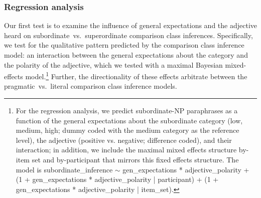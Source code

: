 \documentclass[doc, floatsintext]{apa6}
\newcommand{\red}[1]{\textcolor{Red}{#1}}
\newcommand{\mht}[1]{\textcolor{Blue}{[mht: #1]}}
\begin{document}


\subsubsection{Regression analysis}

Our first test is to examine the influence of general expectations and the adjective heard on subordinate~vs.~superordinate comparison class inferences.
Specifically, we test for the qualitative pattern predicted by the comparison class inference model: an interaction between the general expectations about the category and the polarity of the adjective, which we tested with a maximal Bayesian mixed-effects model.\footnote{
	For the regression analysis, we predict subordinate-NP paraphrases as a function of the general expectations about the subordinate category (low, medium, high; dummy coded with the medium category as the reference level), the adjective (positive vs. negative; difference coded), and their interaction; in addition, we include the maximal mixed effects structure by-item set and by-participant that mirrors this fixed effects structure. The model is subordinate\_inference $\sim$ gen\_expectations * adjective\_polarity + (1 + gen\_expectations * adjective\_polarity | participant) + (1 + gen\_expectations * adjective\_polarity | item\_set).
}
Further, the directionality of these effects arbitrate between the pragmatic~vs.~literal comparison class inference models. 
\end{document}
